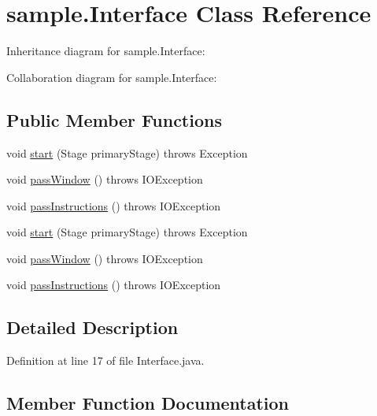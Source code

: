 \hypertarget{classsample_1_1_interface}{}\section{sample.\+Interface Class Reference}
\label{classsample_1_1_interface}


Inheritance diagram for sample.\+Interface\+:


Collaboration diagram for sample.\+Interface\+:
\subsection*{Public Member Functions}
\begin{DoxyCompactItemize}
\item 
void \mbox{\hyperlink{classsample_1_1_interface_a0226e93400c0b54f5f112eb32aeeae76}{start}} (Stage primary\+Stage)  throws Exception
\item 
void \mbox{\hyperlink{classsample_1_1_interface_a845d7280ea87f3cd86c8f30b997312dc}{pass\+Window}} ()  throws I\+O\+Exception 
\item 
void \mbox{\hyperlink{classsample_1_1_interface_a98d6d48177ac553f1739b565cac0402c}{pass\+Instructions}} ()  throws I\+O\+Exception 
\item 
void \mbox{\hyperlink{classsample_1_1_interface_a0226e93400c0b54f5f112eb32aeeae76}{start}} (Stage primary\+Stage)  throws Exception
\item 
void \mbox{\hyperlink{classsample_1_1_interface_a845d7280ea87f3cd86c8f30b997312dc}{pass\+Window}} ()  throws I\+O\+Exception 
\item 
void \mbox{\hyperlink{classsample_1_1_interface_a98d6d48177ac553f1739b565cac0402c}{pass\+Instructions}} ()  throws I\+O\+Exception 
\end{DoxyCompactItemize}


\subsection{Detailed Description}


Definition at line 17 of file Interface.\+java.



\subsection{Member Function Documentation}
\mbox{\label{classsample_1_1_interface_a98d6d48177ac553f1739b565cac0402c}} 
